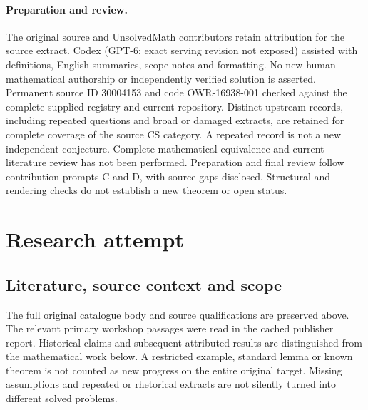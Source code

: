 \documentclass[11pt]{article}
\begin{document}
\paragraph{Preparation and review.}
The original source and UnsolvedMath contributors retain attribution for the source extract. Codex (GPT-6; exact serving revision not exposed) assisted with definitions, English summaries, scope notes and formatting. No new human mathematical authorship or independently verified solution is asserted. Permanent source ID 30004153 and code OWR-16938-001 checked against the complete supplied registry and current repository. Distinct upstream records, including repeated questions and broad or damaged extracts, are retained for complete coverage of the source CS category. A repeated record is not a new independent conjecture. Complete mathematical-equivalence and current-literature review has not been performed. Preparation and final review follow contribution prompts C and D, with source gaps disclosed. Structural and rendering checks do not establish a new theorem or open status.
\label{end:30004153}

\section{Research attempt}
\subsection{Literature, source context and scope}
The full original catalogue body and source qualifications are preserved above. The relevant primary workshop passages were read in the cached publisher report. Historical claims and subsequent attributed results are distinguished from the mathematical work below. A restricted example, standard lemma or known theorem is not counted as new progress on the entire original target. Missing assumptions and repeated or rhetorical extracts are not silently turned into different solved problems.
\end{document}
